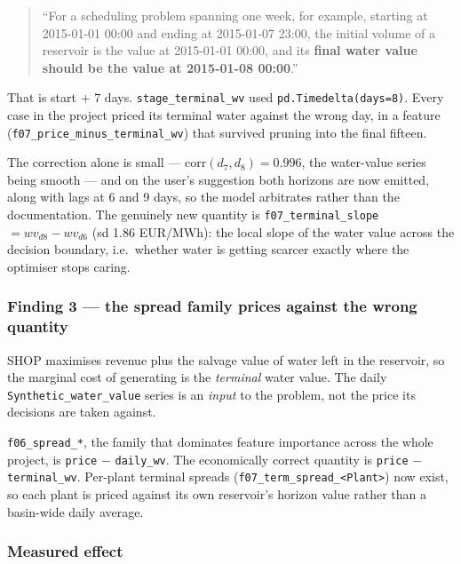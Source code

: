 \begin{quote}
``For a scheduling problem spanning one week, for example, starting at 2015-01-01 00:00 and
ending at 2015-01-07 23:00, the initial volume of a reservoir is the value at 2015-01-01 00:00,
and its \textbf{final water value should be the value at 2015-01-08 00:00}.''
\end{quote}

That is start $+$ 7 days. \texttt{stage\_terminal\_wv} used \texttt{pd.Timedelta(days=8)}. Every
case in the project priced its terminal water against the wrong day, in a feature
(\texttt{f07\_price\_minus\_terminal\_wv}) that survived pruning into the final fifteen.

The correction alone is small --- $\mathrm{corr}(d_7, d_8) = 0.996$, the water-value series being
smooth --- and on the user's suggestion both horizons are now emitted, along with lags at 6 and
9 days, so the model arbitrates rather than the documentation. The genuinely new quantity is
\texttt{f07\_terminal\_slope} $= wv_{d8} - wv_{d6}$ (sd 1.86 EUR/MWh): the local slope of the
water value across the decision boundary, i.e.\ whether water is getting scarcer exactly where
the optimiser stops caring.

\subsubsection*{Finding 3 --- the spread family prices against the wrong quantity}

SHOP maximises revenue plus the salvage value of water left in the reservoir, so the marginal
cost of generating is the \emph{terminal} water value. The daily \texttt{Synthetic\_water\_value}
series is an \emph{input} to the problem, not the price its decisions are taken against.

\begin{finding}
\texttt{f06\_spread\_*}, the family that dominates feature importance across the whole project,
is \texttt{price} $-$ \texttt{daily\_wv}. The economically correct quantity is \texttt{price}
$-$ \texttt{terminal\_wv}. Per-plant terminal spreads (\texttt{f07\_term\_spread\_<Plant>}) now
exist, so each plant is priced against its own reservoir's horizon value rather than a
basin-wide daily average.
\end{finding}

\subsubsection*{Measured effect}

